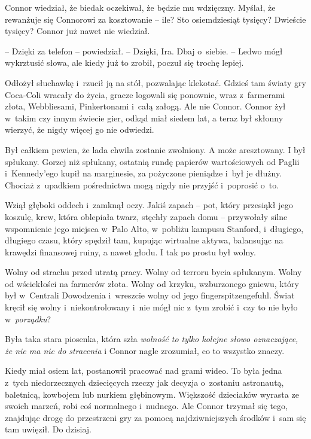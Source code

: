 \documentclass[oneside,polish,11pt,rmheadings]{mwbk}
\begin{document}
 Connor wiedział, że biedak oczekiwał, że będzie mu wdzięczny. Myślał, że rewanżuje się Connorowi za kosztowanie -- ile? Sto osiemdziesiąt tysięcy? Dwieście tysięcy? Connor już nawet nie wiedział.

-- Dzięki za telefon -- powiedział. -- Dzięki, Ira. Dbaj o~siebie. -- Ledwo mógł wykrztusić słowa, ale kiedy już to zrobił, poczuł się trochę lepiej.

Odłożył słuchawkę i~rzucił ją na stół, pozwalając klekotać. Gdzieś tam światy gry Coca-Coli wracały do życia, gracze logowali się ponownie, wraz z~farmerami złota, Webbliesami, Pinkertonami i~całą załogą. Ale nie Connor. Connor żył w~takim czy innym świecie gier, odkąd miał siedem lat, a teraz był skłonny wierzyć, że nigdy więcej go nie odwiedzi.

Był całkiem pewien, że lada chwila zostanie zwolniony. A może aresztowany. I był spłukany. Gorzej niż spłukany, ostatnią rundę papierów wartościowych od Paglii i~Kennedy'ego kupił na marginesie, za pożyczone pieniądze i~był je dłużny. Chociaż z~upadkiem pośrednictwa mogą nigdy nie przyjść i~poprosić o~to.

Wziął głęboki oddech i~zamknął oczy. Jakiś zapach -- pot, który przesiąkł jego koszulę, krew, która oblepiała twarz, stęchły zapach domu -- przywołały silne wspomnienie jego miejsca w~Palo Alto, w~pobliżu kampusu Stanford, i~długiego, długiego czasu, który spędził tam, kupując wirtualne aktywa, balansując na krawędzi finansowej ruiny, a nawet głodu. I tak po prostu był wolny.

Wolny od strachu przed utratą pracy. Wolny od terroru bycia spłukanym. Wolny od wściekłości na farmerów złota. Wolny od krzyku, wzburzonego gniewu, który był w~Centrali Dowodzenia i~wreszcie wolny od jego fingerspitzengefuhl. Świat kręcił się wolny i~niekontrolowany i~nie mógł nic z~tym zrobić i~czy to nie było w~\textit{porządku}?

Była taka stara piosenka, która szła \textit{wolność to tylko kolejne słowo oznaczające, że nie ma nic do stracenia }i Connor nagle zrozumiał, co to wszystko znaczy.

Kiedy miał osiem lat, postanowił pracować nad grami wideo. To była jedna z~tych niedorzecznych dziecięcych rzeczy jak decyzja o~zostaniu astronautą, baletnicą, kowbojem lub nurkiem głębinowym. Większość dzieciaków wyrasta ze swoich marzeń, robi coś normalnego i~nudnego. Ale Connor trzymał się tego, znajdując drogę do przestrzeni gry za pomocą najdziwniejszych środków i~sam się tam uwięził. Do dzisiaj.
\end{document}
